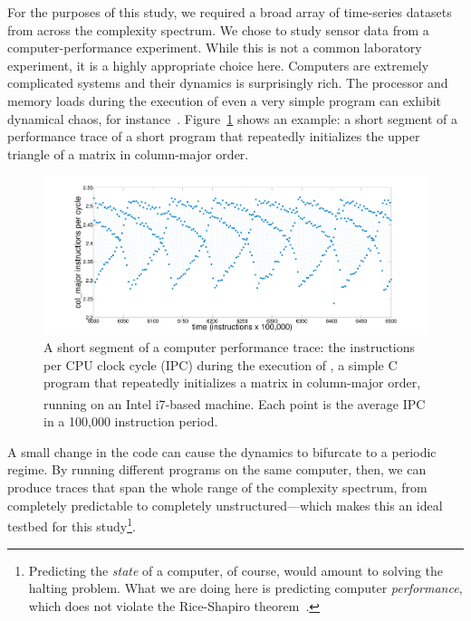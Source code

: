 For the purposes of this study, we required a broad array of
time-series datasets from across the complexity spectrum.  We chose to
study sensor data from a computer-performance experiment.  While this
is not a common laboratory experiment, it is a highly appropriate
choice here.  Computers are extremely complicated systems and their
dynamics is surprisingly rich.
The processor and memory loads during the execution of even a very
simple program can exhibit dynamical chaos, for
instance~\cite{mytkowicz09}.  Figure~\ref{fig:col-ipc} shows an
example: a short segment of a performance trace of a short program
that repeatedly initializes the upper triangle of a matrix in
column-major order.
%
 \begin{figure}[htp]
    \centering
    \includegraphics[width=\columnwidth]{figs/colshortts}
    \caption{A short segment of a computer performance trace: the
      instructions per CPU clock cycle (IPC) during the execution of
      \col, a simple C program that repeatedly initializes a matrix in
      column-major order, running on an Intel
      i7\textsuperscript{\textregistered}-based machine.  Each point
      is the average IPC in a 100,000 instruction period.}
   \label{fig:col-ipc}
  \end{figure}
%
A small change in the code can cause the dynamics to bifurcate to a
periodic regime.  
% 
By running different programs on the same computer, then, we can
produce traces that span the whole range of the complexity spectrum,
from completely predictable to completely unstructured---which makes
this an ideal testbed for this study\footnote{Predicting the
  \emph{state} of a computer, of course, would amount to solving the
  halting problem.  What we are doing here is predicting computer
  \emph{performance}, which does not violate the Rice-Shapiro
  theorem~\cite{hopcroft2007}.}.

